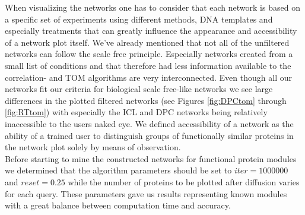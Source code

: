 When visualizing the networks one has to consider that each network is based on a specific set of experiments using different methods, DNA templates and especially treatments that can greatly influence the appearance and accessibility of a network plot itself. We've already mentioned that not all of the unfiltered networks can follow the scale free principle. Especially networks created from a small list of conditions and that therefore had less information available to the correlation- and TOM algorithms are very interconnected. Even though all our networks fit our criteria for biological scale free-like networks we see large differences in the plotted filtered networks (see Figures \ref{fig:DPCtom} through \ref{fig:RTtom}) with especially the ICL and DPC networks being relatively inaccessible to the users naked eye. We defined accessibility of a network as the ability of a trained user to distinguish groups of functionally similar proteins in the network plot solely by means of observation.\\ Before starting to mine the constructed networks for functional protein modules we determined that the algorithm parameters should be set to $iter = 1000000$ and $reset = 0.25$ while the number of proteins to be plotted after diffusion varies for each query. These parameters gave us results representing known modules with a great balance between computation time and accuracy.


